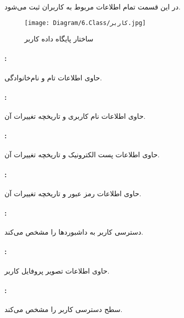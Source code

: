 در این قسمت تمام اطلاعات مربوط به کاربران ثبت می‌شود.

\begin{figure}[H]
	\texttt{[image: Diagram/6.Class/کاربر.jpg]}
	\centering
	\caption{ساختار پایگاه داده کاربر}
	\label{fig:db:کاربر}
\end{figure}

\paragraph{:}
حاوی اطلاعات تام و نام‌خانوادگی.
\paragraph{:}
حاوی اطلاعات نام کاربری و تاریخچه تغییرات آن.
\paragraph{:}
حاوی اطلاعات پست الکترونیک و تاریخچه تغییرات آن.
\paragraph{:}
حاوی اطلاعات رمز عبور و تاریخچه تغییرات آن.
\paragraph{:}
 دسترسی کاربر به داشبورد‌ها را مشخص می‌کند.
\paragraph{:}
حاوی اطلاعات تصویر پروفایل کاربر.
\paragraph{:}
سطح دسترسی کاربر را مشخص می‌کند.